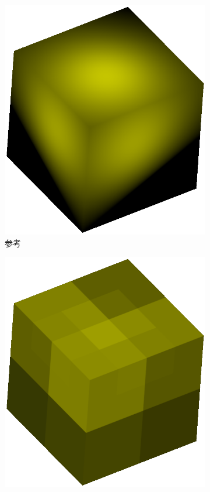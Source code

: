 \begin{figure}
\begin{fullwidth}
	\begin{subfigure}[b]{0.245\thewidth}
		\includegraphics[width=\textwidth]{figures/pl/reconstruction-reference}
		\caption{参考}
	\end{subfigure}
	\begin{subfigure}[b]{0.245\thewidth}
		\includegraphics[width=\textwidth]{figures/pl/reconstruction-box}

\end{subfigure}
\end{fullwidth}
\end{figure}
